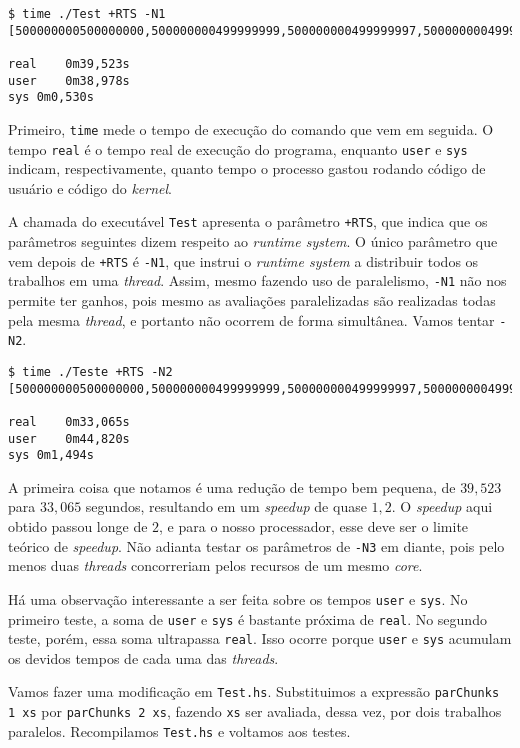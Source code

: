 \documentclass[a4paper]{article}
\begin{document}
\begin{verbatim}
$ time ./Test +RTS -N1
[500000000500000000,500000000499999999,500000000499999997,500000000499999994]

real	0m39,523s
user	0m38,978s
sys	0m0,530s
\end{verbatim}

Primeiro, \texttt{time} mede o tempo de execução do comando que vem em seguida.
O tempo \texttt{real} é o tempo real de execução do programa, enquanto \texttt{user} e \texttt{sys} indicam, respectivamente, quanto tempo o processo gastou rodando código de usuário e código do \emph{kernel}.

A chamada do executável \texttt{Test} apresenta o parâmetro \texttt{+RTS}, que indica que os parâmetros seguintes dizem respeito ao \emph{runtime system}.
O único parâmetro que vem depois de \texttt{+RTS} é \texttt{-N1}, que instrui o \emph{runtime system} a distribuir todos os trabalhos em uma \emph{thread}.
Assim, mesmo fazendo uso de paralelismo, \texttt{-N1} não nos permite ter ganhos, pois mesmo as avaliações paralelizadas são realizadas todas pela mesma \emph{thread}, e portanto não ocorrem de forma simultânea.
Vamos tentar \texttt{-N2}.

\begin{verbatim}
$ time ./Teste +RTS -N2
[500000000500000000,500000000499999999,500000000499999997,500000000499999994]

real	0m33,065s
user	0m44,820s
sys	0m1,494s
\end{verbatim}

A primeira coisa que notamos é uma redução de tempo bem pequena, de $39,523$ para $33,065$ segundos, resultando em um \emph{speedup} de quase $1,2$.
O \emph{speedup} aqui obtido passou longe de $2$, e para o nosso processador, esse deve ser o limite teórico de \emph{speedup}.
Não adianta testar os parâmetros de \texttt{-N3} em diante, pois pelo menos duas \emph{threads} concorreriam pelos recursos de um mesmo \emph{core}.

Há uma observação interessante a ser feita sobre os tempos \texttt{user} e \texttt{sys}.
No primeiro teste, a soma de \texttt{user} e \texttt{sys} é bastante próxima de \texttt{real}.
No segundo teste, porém, essa soma ultrapassa \texttt{real}.
Isso ocorre porque \texttt{user} e \texttt{sys} acumulam os devidos tempos de cada uma das \emph{threads}.

Vamos fazer uma modificação em \texttt{Test.hs}.
Substituimos a expressão \texttt{parChunks 1 xs} por \texttt{parChunks 2 xs}, fazendo \texttt{xs} ser avaliada, dessa vez, por dois trabalhos paralelos.
Recompilamos \texttt{Test.hs} e voltamos aos testes.
\end{document}
